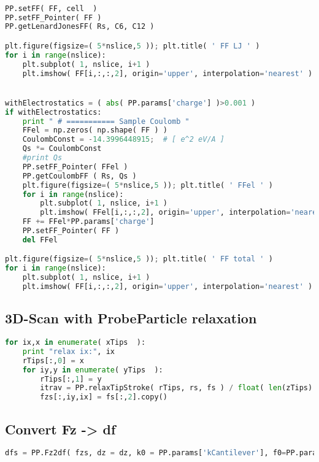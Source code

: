 \begin{shadedbox}
    \begin{lstlisting}[language=python]

PP.setFF( FF, cell  )
PP.setFF_Pointer( FF )
PP.getLenardJonesFF( Rs, C6, C12 )

plt.figure(figsize=( 5*nslice,5 )); plt.title( ' FF LJ ' )
for i in range(nslice):
    plt.subplot( 1, nslice, i+1 )
    plt.imshow( FF[i,:,:,2], origin='upper', interpolation='nearest' )


withElectrostatics = ( abs( PP.params['charge'] )>0.001 )
if withElectrostatics: 
    print " # =========== Sample Coulomb "
    FFel = np.zeros( np.shape( FF ) )
    CoulombConst = -14.3996448915;  # [ e^2 eV/A ]
    Qs *= CoulombConst
    #print Qs
    PP.setFF_Pointer( FFel )
    PP.getCoulombFF ( Rs, Qs )
    plt.figure(figsize=( 5*nslice,5 )); plt.title( ' FFel ' )
    for i in range(nslice):
        plt.subplot( 1, nslice, i+1 )
        plt.imshow( FFel[i,:,:,2], origin='upper', interpolation='nearest' )
    FF += FFel*PP.params['charge']
    PP.setFF_Pointer( FF )
    del FFel

plt.figure(figsize=( 5*nslice,5 )); plt.title( ' FF total ' )
for i in range(nslice):
    plt.subplot( 1, nslice, i+1 )
    plt.imshow( FF[i,:,:,2], origin='upper', interpolation='nearest' )
   \end{lstlisting}
\end{shadedbox}

\subsection{3D-Scan with ProbeParticle relaxation}
\begin{shadedbox}
    \begin{lstlisting}[language=python]
for ix,x in enumerate( xTips  ):
    print "relax ix:", ix
    rTips[:,0] = x
    for iy,y in enumerate( yTips  ):
        rTips[:,1] = y
        itrav = PP.relaxTipStroke( rTips, rs, fs ) / float( len(zTips) )
        fzs[:,iy,ix] = fs[:,2].copy()
    \end{lstlisting}
\end{shadedbox}



\subsection{Convert Fz -> df}
\begin{shadedbox}
    \begin{lstlisting}[language=python]
dfs = PP.Fz2df( fzs, dz = dz, k0 = PP.params['kCantilever'], f0=PP.params['f0Cantilever'], n=int(PP.params['Amplitude']/dz) )
    \end{lstlisting}
\end{shadedbox}



